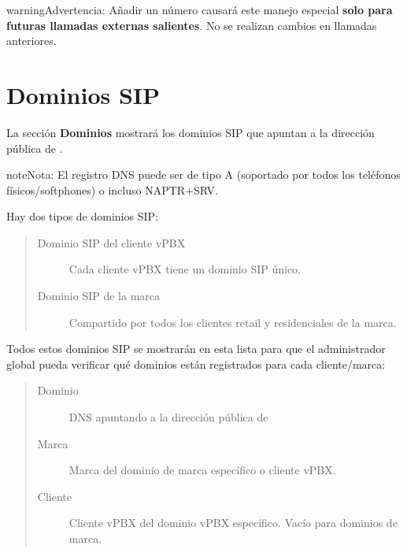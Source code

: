 \documentclass[letterpaper,10pt,spanish]{sphinxmanual}
\begin{document}
\begin{notice}{warning}{Advertencia:}
Añadir un número causará este manejo especial \textbf{solo para futuras llamadas externas salientes}. No se realizan cambios en llamadas anteriores.
\end{notice}
\label{administration_portal/platform/sip_domains:god-sipdomains}

\section{Dominios SIP}
\label{administration_portal/platform/sip_domains:sip-domains}\label{administration_portal/platform/sip_domains::doc}\label{administration_portal/platform/sip_domains:god-sipdomains}\label{administration_portal/platform/sip_domains:id1}
La sección \textbf{Dominios} mostrará los dominios SIP que apuntan a la dirección pública de {\hyperref[administration_portal/platform/infrastructure/proxy_users:proxyusers]{}}.

\begin{notice}{note}{Nota:}
El registro DNS puede ser de tipo A (soportado por todos los teléfonos físicos/softphones) o incluso NAPTR+SRV.
\end{notice}

Hay dos tipos de dominios SIP:
\begin{quote}
\begin{description}
\item[{Dominio SIP del cliente vPBX}] \leavevmode
Cada cliente vPBX tiene un dominio SIP único.

\item[{Dominio SIP de la marca}] \leavevmode
Compartido por todos los clientes retail y residenciales de la marca.

\end{description}
\end{quote}

Todos estos dominios SIP se mostrarán en esta lista para que el administrador global pueda verificar qué dominios están registrados para cada cliente/marca:
\begin{quote}
\begin{description}
\item[{Dominio}] \leavevmode
DNS apuntando a la dirección pública de {\hyperref[administration_portal/platform/infrastructure/proxy_users:proxyusers]{}}

\item[{Marca}] \leavevmode
Marca del dominio de marca específico o cliente vPBX.

\item[{Cliente}] \leavevmode
Cliente vPBX del dominio vPBX específico. Vacío para dominios de marca.

\end{description}
\end{quote}
\label{administration_portal/platform/portals:portals}
\end{document}
